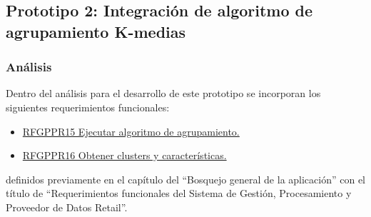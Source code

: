 \subsection{Prototipo 2: Integración de algoritmo de agrupamiento K-medias}

\subsubsection{Análisis}
Dentro del análisis para el desarrollo de este prototipo se incorporan los siguientes requerimientos funcionales:
\begin{itemize}
	\item \hyperlink{RFSGPyPDR}{RFGPPR15 Ejecutar algoritmo de agrupamiento.}
	\item \hyperlink{RFSGPyPDR}{RFGPPR16 Obtener clusters y características.}

\end{itemize}

definidos previamente en el capítulo del ``Bosquejo general de la aplicación''  con el título de ``Requerimientos funcionales del Sistema de Gestión, Procesamiento y Proveedor de Datos Retail''. \\ \par

